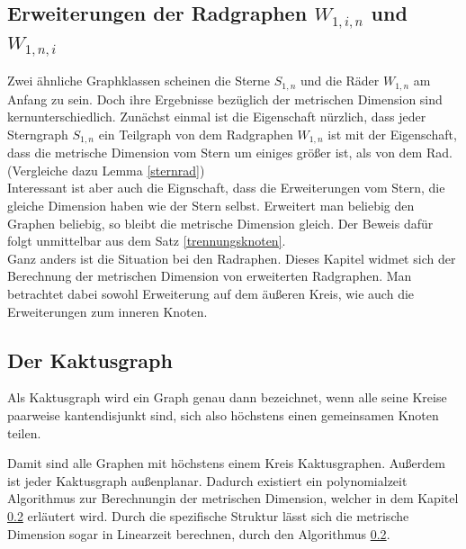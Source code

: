 \subsection{Erweiterungen der Radgraphen $W_{1,i,n}$ und $W_{1,n,i}$}
Zwei ähnliche Graphklassen scheinen die Sterne $S_{1,n}$ und die Räder $W_{1,n}$ am Anfang zu sein. Doch ihre Ergebnisse bezüglich der metrischen Dimension sind kernunterschiedlich. Zunächst einmal ist die Eigenschaft nürzlich, dass jeder Sterngraph $S_{1,n}$ ein Teilgraph von dem Radgraphen $W_{1,n}$ ist mit der Eigenschaft, dass die metrische Dimension vom Stern um einiges größer ist, als von dem Rad. (Vergleiche dazu Lemma \ref{sternrad})\\
Interessant ist aber auch die Eignschaft, dass die Erweiterungen vom Stern, die gleiche Dimension haben wie der Stern selbst. Erweitert man beliebig den Graphen beliebig, so bleibt die metrische Dimension gleich. Der Beweis dafür folgt unmittelbar aus dem Satz \ref{trennungsknoten}.\\
Ganz anders ist die Situation bei den Radraphen. Dieses Kapitel widmet sich der Berechnung der metrischen Dimension von erweiterten Radgraphen. Man betrachtet dabei sowohl Erweiterung auf dem äußeren Kreis, wie auch die Erweiterungen zum inneren Knoten.\\
\clearpage
\subsection{Der Kaktusgraph}
\begin{defi}
Als Kaktusgraph wird ein Graph genau dann bezeichnet, wenn alle seine Kreise paarweise kantendisjunkt sind, sich also höchstens einen gemeinsamen Knoten teilen.
\end{defi}
Damit sind alle Graphen mit höchstens einem Kreis Kaktusgraphen. Außerdem ist jeder Kaktusgraph außenplanar. Dadurch existiert ein polynomialzeit Algorithmus zur Berechnungin der metrischen Dimension, welcher in dem Kapitel \ref{} erläutert wird. Durch die spezifische Struktur lässt sich die metrische Dimension sogar in Linearzeit berechnen, durch den Algorithmus \ref{}.

\clearpage
